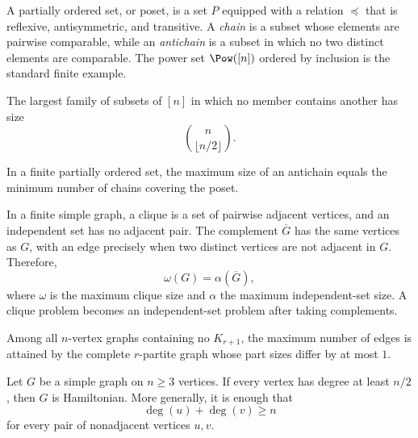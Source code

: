     \begin{definition}
        A partially ordered set, or poset, is a set $P$ equipped with a relation
        $\preceq$ that is reflexive, antisymmetric, and transitive. A
        \emph{chain} is a subset whose elements are pairwise comparable, while
        an \emph{antichain} is a subset in which no two distinct elements are
        comparable. The power set $\Pow([n])$ ordered by inclusion is the
        standard finite example.
    \end{definition}

    \begin{theorem}
        The largest family of subsets of $[n]$ in which no member contains
        another has size
        \[
            \binom{n}{\lfloor n/2\rfloor}.
        \]
    \end{theorem}

    \begin{theorem}
        In a finite partially ordered set, the maximum size of an antichain
        equals the minimum number of chains covering the poset.
    \end{theorem}

    \begin{fact}\label{r4:graph-complement}
        In a finite simple graph, a clique is a set of pairwise adjacent
        vertices, and an independent set has no adjacent pair. The complement
        $\overline G$ has the same vertices as $G$, with an edge precisely
        when two distinct vertices are not adjacent in $G$. Therefore,
        \[
            \omega(G)=\alpha(\overline G),
        \]
        where $\omega$ is the maximum clique size and $\alpha$ the maximum
        independent-set size. A clique problem becomes an independent-set
        problem after taking complements.
    \end{fact}

    \begin{theorem}
        Among all $n$-vertex graphs containing no $K_{r+1}$, the maximum number
        of edges is attained by the complete $r$-partite graph whose part sizes
        differ by at most $1$.
    \end{theorem}

    \begin{theorem}
        Let $G$ be a simple graph on $n\geq3$ vertices. If every vertex has
        degree at least $n/2$, then $G$ is Hamiltonian. More generally, it is
        enough that
        \[
            \deg(u)+\deg(v)\geq n
        \]
        for every pair of nonadjacent vertices $u,v$.
    \end{theorem}

